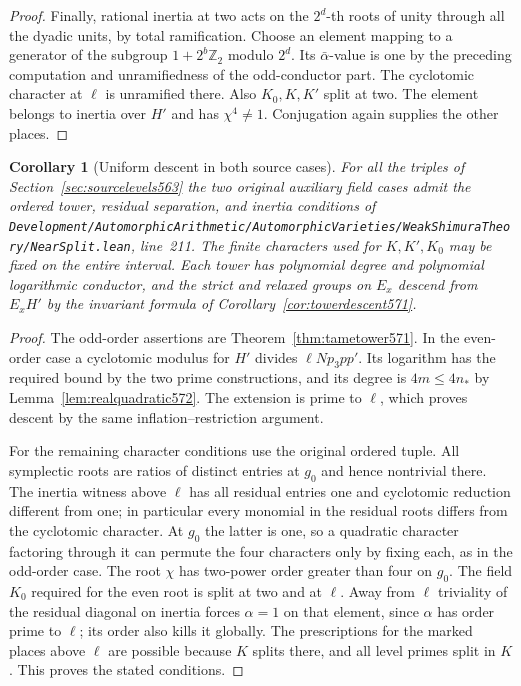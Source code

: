 \documentclass[a4paper,11pt]{article}
\newtheorem{corollary}[proposition]{Corollary}
\theoremstyle{definition}
\theoremstyle{remark}
\newcommand{\ZZ}{\mathbb Z}\newcommand{\ord}{\operatorname{ord}}
\newcommand{\srcloc}[2]{{\small\nolinkurl{#1.lean}}, line~#2}
\numberwithin{equation}{section}
\begin{document}
\begin{proof}
Finally, rational inertia at two acts on the \(2^d\)-th
roots of unity through all the dyadic units, by total
ramification. Choose an element mapping to a generator
of the subgroup \(1+2^b\ZZ_2\) modulo \(2^d\). Its
\(\bar\alpha\)-value is one by the preceding computation
and unramifiedness of the odd-conductor part. The
cyclotomic character at \(\ell\) is unramified there.
Also \(K_0,K,K'\) split at two. The element belongs to
inertia over \(H'\) and has \(\chi^4\ne1\). Conjugation
again supplies the other places.
\end{proof}

\begin{corollary}[Uniform descent in both source cases]
\leavevmode\label{cor:bothaux572}
For all the triples of Section~\ref{sec:sourcelevels563}
the two original auxiliary field cases admit the ordered
tower, residual separation, and inertia conditions of
\srcloc{Development/AutomorphicArithmetic/AutomorphicVarieties/WeakShimuraTheory/NearSplit}{211}.
The finite characters used for \(K,K',K_0\) may be fixed
on the entire interval. Each tower has polynomial degree
and polynomial logarithmic conductor, and the strict
and relaxed groups on \(E_x\) descend from \(E_x H'\)
by the invariant formula of Corollary~\ref{cor:towerdescent571}.
\end{corollary}
\begin{proof}
The odd-order assertions are Theorem~\ref{thm:tametower571}.
In the even-order case a cyclotomic modulus for \(H'\)
divides \(\ell Np_3pp'\). Its logarithm has the required
bound by the two prime constructions, and its degree is
\(4m\le4n_*\) by Lemma~\ref{lem:realquadratic572}.
The extension is prime to \(\ell\), which proves descent
by the same inflation--restriction argument.

For the remaining character conditions use the original
ordered tuple. All symplectic roots are ratios of distinct
entries at \(g_0\) and hence nontrivial there. The inertia
witness above \(\ell\) has all residual entries one and
cyclotomic reduction different from one; in particular
every monomial in the residual roots differs from the
cyclotomic character. At \(g_0\) the latter is one, so a
quadratic character factoring through it can permute the
four characters only by fixing each, as in the odd-order
case. The root \(\chi\) has two-power order greater than
four on \(g_0\). The field \(K_0\) required for the even
root is split at two and at \(\ell\). Away from \(\ell\)
triviality of the residual diagonal on inertia forces
\(\alpha=1\) on that element, since \(\alpha\) has order
prime to \(\ell\); its order also kills it globally.
The prescriptions for the marked places above \(\ell\)
are possible because \(K\) splits there, and all level
primes split in \(K\). This proves the stated conditions.
\end{proof}
\end{document}
